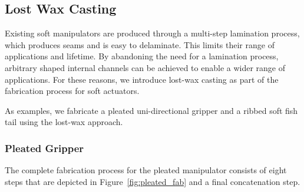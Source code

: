 \subsection{Lost Wax Casting}
\label{subsec:Fabrication, Lost Wax Casting}
Existing soft manipulators are produced through a multi-step lamination process, which produces seams and is easy to delaminate.
This limits their range of applications and lifetime.
By abandoning the need for a lamination process, arbitrary shaped internal channels can be achieved to enable a wider range of applications.
For these reasons, we introduce lost-wax casting as part of the fabrication process for soft actuators.

As examples, we fabricate a pleated uni-directional gripper and a ribbed soft fish tail using the lost-wax approach.

\subsubsection{Pleated Gripper}
\label{subsubsec:Fabrication, Lost Wax Casting, Pleated Gripper}
The complete fabrication process for the pleated manipulator consists of eight steps that are depicted in Figure~\ref{fig:pleated_fab} and a final concatenation step.

